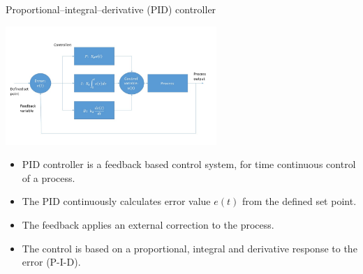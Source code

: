 \documentclass{beamer}
\begin{document}
\begin{frame}{Proportional–integral–derivative (PID) controller}
	\begin{center}		
		\includegraphics[width=0.6\textwidth,keepaspectratio]{pid_diagram_powerpoint.jpg}
    \end{center}
	\begin{itemize}	
		\item PID controller is a feedback based control system, for time continuous control of a process.
		\item The PID continuously calculates error value $e(t)$ from the defined set point. 
		\pause
		\item The feedback applies an external correction to the process.
		\item The control is based on a proportional, integral and derivative response to the error (P-I-D).
	\end{itemize}
\end{frame}
\end{document}
